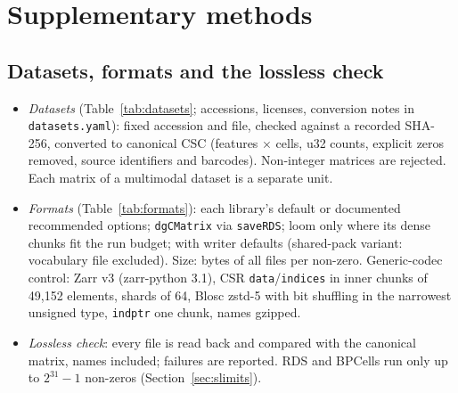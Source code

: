 \section{Supplementary methods}
\label{sec:methods}

\subsection{Datasets, formats and the lossless check}
\begin{itemize}\itemsep 1pt
\item \emph{Datasets} (Table~\ref{tab:datasets}; accessions, licenses, conversion notes in \texttt{datasets.yaml}): fixed
  accession and file, checked against a recorded SHA-256, converted to canonical CSC (features $\times$ cells, u32 counts,
  explicit zeros removed, source identifiers and barcodes). Non-integer matrices are rejected. Each matrix of a multimodal
  dataset is a separate unit.
\item \emph{Formats} (Table~\ref{tab:formats}): each library's default or documented recommended options;
  \texttt{dgCMatrix} via \texttt{saveRDS}; loom only where its dense chunks fit the run budget; \sone{} with writer
  defaults (shared-pack variant: vocabulary file excluded). Size: bytes of all files per non-zero. Generic-codec
  control: Zarr v3 (zarr-python 3.1), CSR \texttt{data}/\texttt{indices} in inner chunks of 49,152 elements, shards of
  64, Blosc zstd-5 with bit shuffling in the narrowest unsigned type, \texttt{indptr} one chunk, names gzipped.
\item \emph{Lossless check}: every file is read back and compared with the canonical matrix, names included; failures
  are reported. RDS and BPCells run only up to $2^{31}-1$ non-zeros (Section~\ref{sec:slimits}).
\end{itemize}

